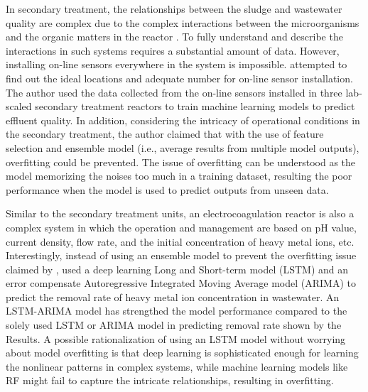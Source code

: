 In secondary treatment, the relationships between the sludge and wastewater quality are complex due to the complex interactions between the microorganisms and the organic matters in the reactor  \citep{wilenMechanismsGranulationActivated2018}. To fully understand and describe the interactions in such systems requires a substantial amount of data. However, installing on-line sensors everywhere in the system is impossible. \citet{zaghloulDevelopmentEnsembleMachine2021} attempted to find out the ideal locations and adequate number for on-line sensor installation. The author used the data collected from the on-line sensors installed in three lab-scaled secondary treatment reactors to train machine learning models to predict effluent quality. In addition, considering the intricacy of operational conditions in the secondary treatment, the author claimed that with the use of feature selection and ensemble model (i.e., average results from multiple model outputs), overfitting could be prevented. The issue of overfitting can be understood as the model memorizing the noises too much in a training dataset, resulting the poor performance when the model is used to predict outputs from unseen data. 

Similar to the secondary treatment units, an electrocoagulation reactor is also a complex system in which the operation and management are based on pH value, current density, flow rate, and the initial concentration of heavy metal ions, etc. Interestingly, instead of using an ensemble model to prevent the overfitting issue claimed by \citet{zaghloulDevelopmentEnsembleMachine2021}, \citet{zhuPredictionMethodElectrocoagulation2021} used a deep learning Long and Short-term model (LSTM) and an error compensate Autoregressive Integrated Moving Average model (ARIMA) to predict the removal rate of heavy metal ion concentration in wastewater. An LSTM-ARIMA model has strengthed the model performance compared to the solely used LSTM or ARIMA model in predicting removal rate shown by the Results. A possible rationalization of using an LSTM model without worrying about model overfitting is that deep learning is sophisticated enough for learning the nonlinear patterns in complex systems, while machine learning models like RF might fail to capture the intricate relationships, resulting in overfitting.

